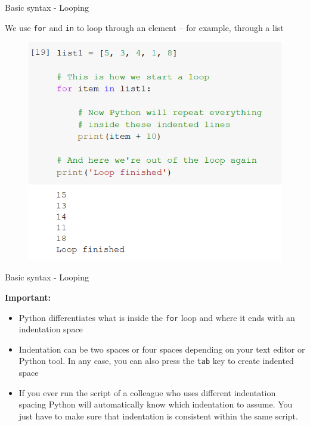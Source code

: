 \documentclass[aspectratio=169]{beamer}
\begin{document}
\begin{frame}{Basic syntax - Looping}

	We use \texttt{for} and \texttt{in} to loop through an element -- for example, through a list 

	\begin{figure}
		\centering
		\includegraphics[width=0.6\linewidth]{img/list_loop.png}
	\end{figure}

\end{frame}

\begin{frame}{Basic syntax - Looping}

	\textbf{Important:}

	\begin{itemize}	
		\item Python differentiates what is inside the \texttt{for} loop and where it ends with an indentation space
		\item Indentation can be two spaces or four spaces depending on your text editor or Python tool. In any case, you can also press the \texttt{tab} key to create indented space
		\item If you ever run the script of a colleague who uses different indentation spacing Python will automatically know which indentation to assume. You just have to make sure that indentation is consistent within the same script.
	\end{itemize}

\end{frame}
\end{document}
